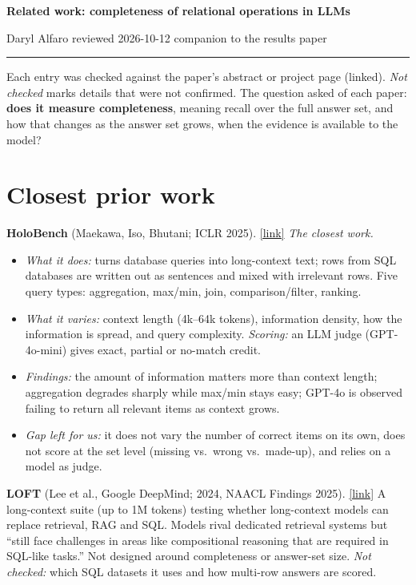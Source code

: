 \documentclass[10pt]{article}
\newcommand{\paper}[3]{\textbf{#1} \textnormal{(#2)}. \href{#3}{\small[link]}}
\begin{document}
{\Large\textbf{Related work: completeness of relational operations in LLMs}}\par
\vspace{2pt}
Daryl Alfaro \quad\textbullet\quad reviewed 2026-10-12 \quad\textbullet\quad companion to the results paper\par
\vspace{-2pt}\rule{\linewidth}{0.4pt}

Each entry was checked against the paper's abstract or project page (linked). \emph{Not checked} marks details
that were not confirmed. The question asked of each paper: \textbf{does it measure completeness}, meaning recall
over the full answer set, and how that changes as the answer set grows, when the evidence is available to the
model?

\section*{Closest prior work}

\paper{HoloBench}{Maekawa, Iso, Bhutani; ICLR 2025}{https://arxiv.org/abs/2410.11996} \emph{The closest work.}
\begin{itemize}
\item \emph{What it does:} turns database queries into long-context text; rows from SQL databases are written out
as sentences and mixed with irrelevant rows. Five query types: aggregation, max/min, join, comparison/filter,
ranking.
\item \emph{What it varies:} context length (4k--64k tokens), information density, how the information is spread,
and query complexity. \emph{Scoring:} an LLM judge (GPT-4o-mini) gives exact, partial or no-match credit.
\item \emph{Findings:} the amount of information matters more than context length; aggregation degrades sharply
while max/min stays easy; GPT-4o is observed failing to return all relevant items as context grows.
\item \emph{Gap left for us:} it does not vary the number of correct items on its own, does not score at the set
level (missing vs.\ wrong vs.\ made-up), and relies on a model as judge.
\end{itemize}

\paper{LOFT}{Lee et al., Google DeepMind; 2024, NAACL Findings 2025}{https://arxiv.org/abs/2406.13121}
A long-context suite (up to 1M tokens) testing whether long-context models can replace retrieval, RAG and SQL.
Models rival dedicated retrieval systems but ``still face challenges in areas like compositional reasoning that
are required in SQL-like tasks.'' Not designed around completeness or answer-set size. \emph{Not checked:} which
SQL datasets it uses and how multi-row answers are scored.
\end{document}
